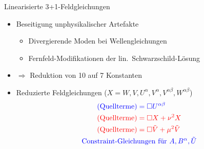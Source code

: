 \documentclass{beamer}
\begin{document}
    \begin{frame}{Linearisierte 3+1-Feldgleichungen}
        \begin{itemize}
            \item Beseitigung unphysikalischer Artefakte
            \begin{itemize}
                \item Divergierende Moden bei Wellengleichungen
                \item Fernfeld-Modifikationen der lin.\ Schwarzschild-Lösung
            \end{itemize}
            \item $\Rightarrow$ Reduktion von 10 auf 7 Konstanten
            \item Reduzierte Feldgleichungen ($X = W,V,U^\alpha,V^\alpha,V^{\alpha\beta},W^{\alpha\beta}$)
            \begin{gather*}
                \begin{aligned}
                    \color{blue}\text{(Quellterme)} &\color{blue}= \Box U^{\alpha\beta} \\
                    \color{red}\text{(Quellterme)} &\color{red}= \Box X + \nu^2 X \\
                    \color{red}\text{(Quellterme)} &\color{red}= \Box \tilde V + \mu^2 \tilde V \\
                \end{aligned} \\
                \color{blue}\text{Constraint-Gleichungen für }A, B^\alpha, \tilde U
            \end{gather*}
        \end{itemize}
    \end{frame}
\end{document}
